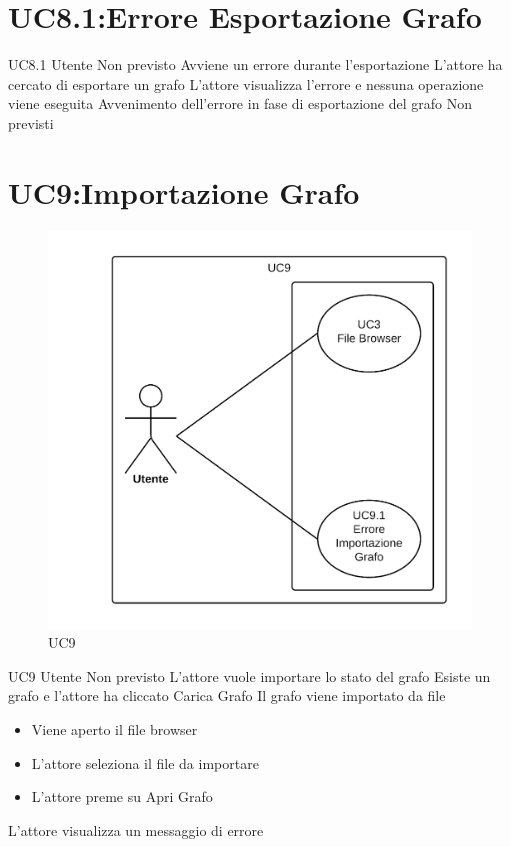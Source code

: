 \documentclass[../AnalisideiRequisiti.tex]{subfiles}
\begin{document}
\section{UC8.1:Errore Esportazione Grafo}
\UserCase
{UC8.1}
{Utente}
{Non previsto}
{Avviene un errore durante l'esportazione}
{L'attore ha cercato di esportare un grafo}
{L'attore visualizza l'errore e nessuna operazione viene eseguita}
{Avvenimento dell'errore in fase di esportazione del grafo}
{Non previsti}

\section{UC9:Importazione Grafo}
\begin{figure}[H]
	\caption{UC9}
	\centering
	\includegraphics[width=\textwidth]{../img/UC09.png}
\end{figure}
\UserCase
{UC9}
{Utente}
{Non previsto}
{L'attore vuole importare lo stato del grafo}
{Esiste un grafo e l'attore ha cliccato Carica Grafo}
{Il grafo viene importato da file}
{
	\begin{itemize}
			\item{} Viene aperto il file browser 
			\item{} L'attore seleziona il file da importare 
			\item{} L'attore preme su Apri Grafo
	\end{itemize}
}
{L'attore visualizza un messaggio di errore }
\end{document}
